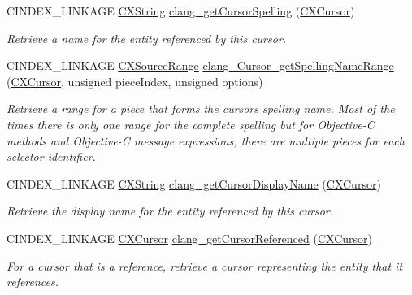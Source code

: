 \begin{DoxyCompactItemize}
\mbox{\label{group__CINDEX__CURSOR__XREF_gaad1c9b2a1c5ef96cebdbc62f1671c763}} 
C\+I\+N\+D\+E\+X\+\_\+\+L\+I\+N\+K\+A\+GE \mbox{\hyperlink{structCXString}{C\+X\+String}} \mbox{\hyperlink{group__CINDEX__CURSOR__XREF_gaad1c9b2a1c5ef96cebdbc62f1671c763}{clang\+\_\+get\+Cursor\+Spelling}} (\mbox{\hyperlink{structCXCursor}{C\+X\+Cursor}})
\begin{DoxyCompactList}\small\item\em Retrieve a name for the entity referenced by this cursor. \end{DoxyCompactList}\item 
C\+I\+N\+D\+E\+X\+\_\+\+L\+I\+N\+K\+A\+GE \mbox{\hyperlink{structCXSourceRange}{C\+X\+Source\+Range}} \mbox{\hyperlink{group__CINDEX__CURSOR__XREF_ga251b31de80fd14681edf46f43b0bd03b}{clang\+\_\+\+Cursor\+\_\+get\+Spelling\+Name\+Range}} (\mbox{\hyperlink{structCXCursor}{C\+X\+Cursor}}, unsigned piece\+Index, unsigned options)
\begin{DoxyCompactList}\small\item\em Retrieve a range for a piece that forms the cursors spelling name. Most of the times there is only one range for the complete spelling but for Objective-\/C methods and Objective-\/C message expressions, there are multiple pieces for each selector identifier. \end{DoxyCompactList}\item 
C\+I\+N\+D\+E\+X\+\_\+\+L\+I\+N\+K\+A\+GE \mbox{\hyperlink{structCXString}{C\+X\+String}} \mbox{\hyperlink{group__CINDEX__CURSOR__XREF_gac3eba3224d109a956f9ef96fd4fe5c83}{clang\+\_\+get\+Cursor\+Display\+Name}} (\mbox{\hyperlink{structCXCursor}{C\+X\+Cursor}})
\begin{DoxyCompactList}\small\item\em Retrieve the display name for the entity referenced by this cursor. \end{DoxyCompactList}\item 
C\+I\+N\+D\+E\+X\+\_\+\+L\+I\+N\+K\+A\+GE \mbox{\hyperlink{structCXCursor}{C\+X\+Cursor}} \mbox{\hyperlink{group__CINDEX__CURSOR__XREF_gabf059155921552e19fc2abed5b4ff73a}{clang\+\_\+get\+Cursor\+Referenced}} (\mbox{\hyperlink{structCXCursor}{C\+X\+Cursor}})
\begin{DoxyCompactList}\small\item\em For a cursor that is a reference, retrieve a cursor representing the entity that it references. \end{DoxyCompactList}\item 

\end{DoxyCompactItemize}

